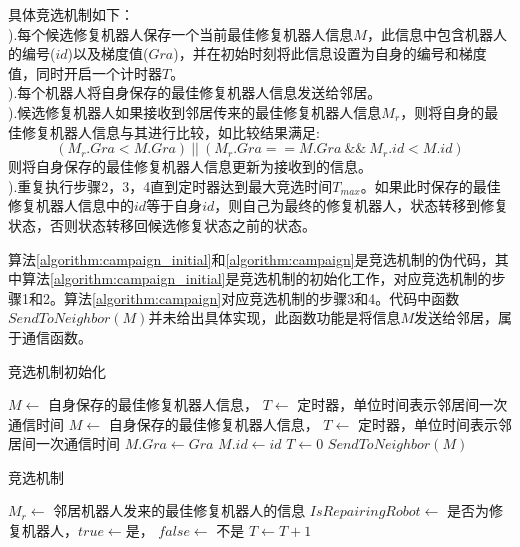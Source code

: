 具体竞选机制如下：\\
).每个候选修复机器人保存一个当前最佳修复机器人信息$M$，此信息中包含机器人的编号($id$)以及梯度值($Gra$)，并在初始时刻将此信息设置为自身的编号和梯度值，同时开启一个计时器$T$。\\
).每个机器人将自身保存的最佳修复机器人信息发送给邻居。\\
).候选修复机器人如果接收到邻居传来的最佳修复机器人信息$M_r$，则将自身的最佳修复机器人信息与其进行比较，如比较结果满足:\\
\[
	(M_r.Gra < M.Gra)\ ||\ (M_r.Gra == M.Gra\ \&\& \  M_r.id < M.id) 
\]
则将自身保存的最佳修复机器人信息更新为接收到的信息。\\
).重复执行步骤2，3，4直到定时器达到最大竞选时间$T_{max}$。如果此时保存的最佳修复机器人信息中的$id$等于自身$id$，则自己为最终的修复机器人，状态转移到修复状态，否则状态转移回候选修复状态之前的状态。

算法\ref{algorithm:campaign_initial}和\ref{algorithm:campaign}是竞选机制的伪代码，其中算法\ref{algorithm:campaign_initial}是竞选机制的初始化工作，对应竞选机制的步骤1和2。算法\ref{algorithm:campaign}对应竞选机制的步骤3和4。代码中函数$SendToNeighbor(M)$并未给出具体实现，此函数功能是将信息$M$发送给邻居，属于通信函数。
\begin{algorithm}
	\caption{竞选机制初始化}
	\label{algorithm:campaign_initial}
	\begin{algorithmic}[1]
		\Require $M \leftarrow$ 自身保存的最佳修复机器人信息， $T \leftarrow$ 定时器，单位时间表示邻居间一次通信时间
		\Ensure $M \leftarrow$ 自身保存的最佳修复机器人信息， $T \leftarrow$ 定时器，单位时间表示邻居间一次通信时间
			\State $M.Gra \gets Gra$
			\State $M.id \gets id$
			\State $T \gets 0$
			\State $SendToNeighbor(M)$
			\State {}
		\EndFunction
	\end{algorithmic}	
\end{algorithm}

\begin{algorithm}
	\caption{竞选机制}
	\label{algorithm:campaign}
	\begin{algorithmic}[1]
		\Require $M_r \leftarrow$ 邻居机器人发来的最佳修复机器人的信息
		\Ensure $IsRepairingRobot \leftarrow$ 是否为修复机器人，$true \leftarrow $是， $ false \leftarrow$ 不是
			\State $T \gets T+1$					
	\end{algorithmic}
\end{algorithm}

